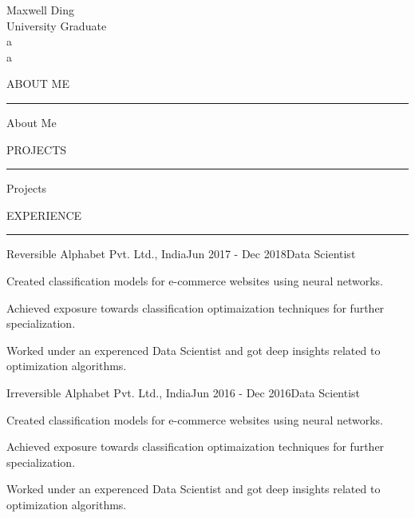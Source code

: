 \documentclass[letterpaper, 10pt]{resume}
\renewenvironment{rSection}[1]{
\sectionskip
\textcolor{blue-violet}{\MakeUppercase{#1}}
\sectionlineskip
\hrule
\begin{list}{}{
	\setlength{\leftmargin}{1.5em}
}
	\item[]
}{
\end{list}
}
\begin{document}
\begin{center}
{\Huge Maxwell Ding} \\ 
{\color{blue-violet} \large University Graduate} \\ {\color{white} a} \\ {\color{white} a} %
\end{center}


\begin{multicols}{2} %

\begin{rSection}{About Me}
\color{black}
\item About Me
\end{rSection}

\begin{rSection}{Projects}
\color{black}
\item Projects
\end{rSection}

\begin{rSection}{Experience}
\color{black}
\begin{rSubsection}{Reversible Alphabet Pvt. Ltd., India}{Jun 2017 - Dec 2018}{Data Scientist}{}
 \item Created classification models for e-commerce websites using neural networks.
 \item Achieved exposure towards classification optimaization techniques for further specialization.
 \item Worked under an experenced Data Scientist and got deep insights related to optimization algorithms.
\end{rSubsection}
\begin{rSubsection}{Irreversible Alphabet Pvt. Ltd., India}{Jun 2016 - Dec 2016}{Data Scientist}{}
 \item Created classification models for e-commerce websites using neural networks.
 \item Achieved exposure towards classification optimaization techniques for further specialization.
 \item Worked under an experenced Data Scientist and got deep insights related to optimization algorithms.
\end{rSubsection}
\end{rSection}


\end{multicols}
\end{document}
